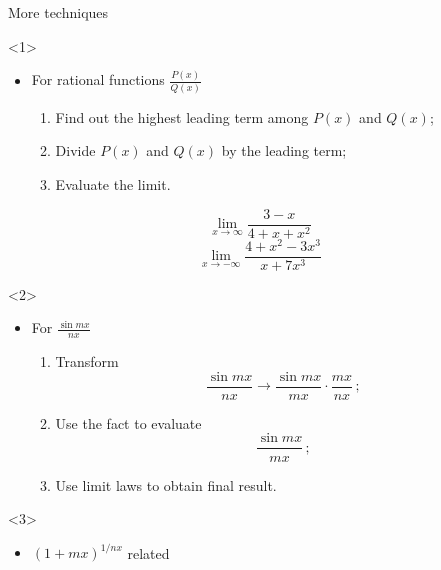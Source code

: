 \begin{frame}{More techniques}

\begin{onlyenv}<1>

\begin{itemize}
\item For rational functions $\frac{P\left(x\right)}{Q\left(x\right)}$

\begin{enumerate}
\item Find out the highest leading term among $P\left(x\right)$ and $Q\left(x\right)$;
\item Divide $P\left(x\right)$ and $Q\left(x\right)$ by the leading term;
\item Evaluate the limit.
\end{enumerate}
\end{itemize}
\begin{example}
\[
\lim_{x\to\infty}\frac{3-x}{4+x+x^{2}}
\]
\[
\lim_{x\to-\infty}\frac{4+x^{2}-3x^{3}}{x+7x^{3}}
\]



\end{example}

\end{onlyenv}



\begin{onlyenv}<2>

\begin{itemize}
\item For $\frac{\sin mx}{nx}$

\begin{enumerate}
\item Transform
\[
\frac{\sin mx}{nx}\longrightarrow\frac{\sin mx}{mx}\cdot\frac{mx}{nx}\,;
\]

\item Use the fact to evaluate
\[
\frac{\sin mx}{mx}\,;
\]

\item Use limit laws to obtain final result.
\end{enumerate}
\end{itemize}
\end{onlyenv}



\begin{onlyenv}<3>

\begin{itemize}
\item $\left(1+mx\right)^{1/nx}$ related


\end{itemize}
\end{onlyenv}
\end{frame}
